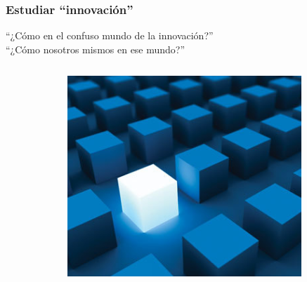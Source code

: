 \frame
{
\frametitle{Estudiar ``innovación''}
\vspace{1cm}
\begin{center}
	``¿Cómo  en el confuso mundo de la innovación?''\\
	``¿Cómo  nosotros mismos en ese mundo?''
\end{center}
\begin{columns}
\begin{column}{0.6\textwidth}
\end{column}
\begin{column}{0.4\textwidth}
	\includegraphics[width=0.8\textwidth]{img/innovacion}
\end{column}
\end{columns}
}

